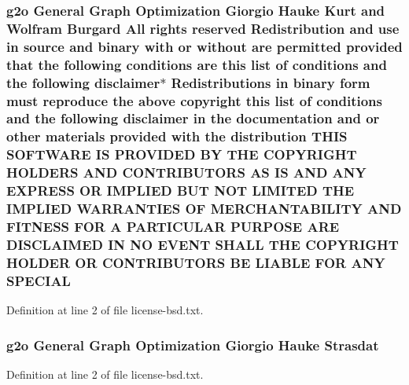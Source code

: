 \subsubsection[{\texorpdfstring{S\+P\+E\+C\+I\+AL}{SPECIAL}}]{\setlength{\rightskip}{0pt plus 5cm}g2o General Graph Optimization Giorgio Hauke Kurt and Wolfram Burgard All rights reserved Redistribution and use in source and binary with or without are permitted provided that the following conditions are this list of conditions and the following disclaimer$\ast$ Redistributions in binary form must reproduce the above copyright this list of conditions and the following disclaimer in the documentation and or other materials provided with the distribution T\+H\+IS S\+O\+F\+T\+W\+A\+RE IS P\+R\+O\+V\+I\+D\+ED BY T\+HE C\+O\+P\+Y\+R\+I\+G\+HT H\+O\+L\+D\+E\+RS A\+ND C\+O\+N\+T\+R\+I\+B\+U\+T\+O\+RS AS IS A\+ND A\+NY E\+X\+P\+R\+E\+SS OR I\+M\+P\+L\+I\+ED B\+UT N\+OT L\+I\+M\+I\+T\+ED T\+HE I\+M\+P\+L\+I\+ED {\bf W\+A\+R\+R\+A\+N\+T\+I\+ES} OF M\+E\+R\+C\+H\+A\+N\+T\+A\+B\+I\+L\+I\+TY A\+ND F\+I\+T\+N\+E\+SS F\+OR A P\+A\+R\+T\+I\+C\+U\+L\+AR P\+U\+R\+P\+O\+SE A\+RE D\+I\+S\+C\+L\+A\+I\+M\+ED IN NO E\+V\+E\+NT S\+H\+A\+LL T\+HE C\+O\+P\+Y\+R\+I\+G\+HT H\+O\+L\+D\+ER OR C\+O\+N\+T\+R\+I\+B\+U\+T\+O\+RS BE L\+I\+A\+B\+LE F\+OR A\+NY S\+P\+E\+C\+I\+AL}\hypertarget{license-bsd_8txt_a325a50f101f6b95e7e5c58bf30a93510}{}\label{license-bsd_8txt_a325a50f101f6b95e7e5c58bf30a93510}


Definition at line 2 of file license-\/bsd.\+txt.

\subsubsection[{\texorpdfstring{Strasdat}{Strasdat}}]{\setlength{\rightskip}{0pt plus 5cm}g2o General Graph Optimization Giorgio Hauke Strasdat}\hypertarget{license-bsd_8txt_a0d2375d81ba004404281c3e070f2504a}{}\label{license-bsd_8txt_a0d2375d81ba004404281c3e070f2504a}


Definition at line 2 of file license-\/bsd.\+txt.

